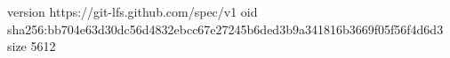 version https://git-lfs.github.com/spec/v1
oid sha256:bb704e63d30dc56d4832ebcc67e27245b6ded3b9a341816b3669f05f56f4d6d3
size 5612
